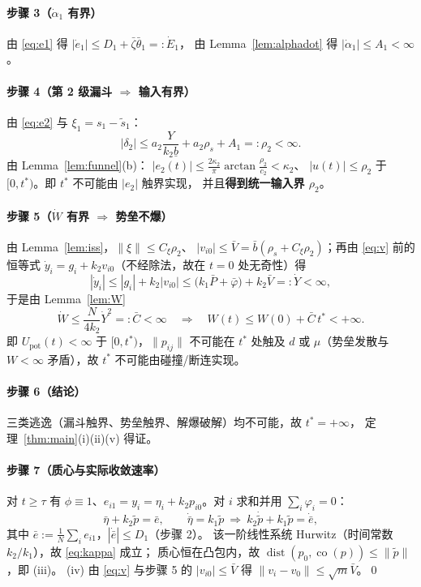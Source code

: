 \documentclass[11pt,a4paper]{article}
\newcommand{\ub}{\underline{b}}
\newcommand{\dist}{\operatorname{dist}}
\newcommand{\co}{\operatorname{co}}
\theoremstyle{plain}
\theoremstyle{definition}
\theoremstyle{remark}
\begin{document}
\paragraph{步骤 3（$\dot\alpha_1$ 有界）}
由 \eqref{eq:e1} 得 $|\dot e_1|\le D_1+\bar\zeta\bar\theta_1=:\dot E_1$，
由 Lemma~\ref{lem:alphadot} 得 $|\dot\alpha_1|\le A_1<\infty$。

\paragraph{步骤 4（第 2 级漏斗 $\Rightarrow$ 输入有界）}
由 \eqref{eq:e2} 与 $\xi_1=s_1-\tilde s_1$：
\begin{equation*}
|\delta_2|\le a_2\frac{Y}{k_2\ub}+a_2\rho_s+A_1=:\rho_2<\infty .
\end{equation*}
由 Lemma~\ref{lem:funnel}(b)：
$|e_2(t)|\le\frac{2\kappa_2}{\pi}\arctan\frac{\rho_2}{c_2}<\kappa_2$、
$|u(t)|\le\rho_2$ 于 $[0,t^\ast)$。即 $t^\ast$ 不可能由 $|e_2|$ 触界实现，
并且\textbf{得到统一输入界 $\rho_2$}。

\paragraph{步骤 5（$\dot W$ 有界 $\Rightarrow$ 势垒不爆）}
由 Lemma~\ref{lem:iss}，$\|\xi\|\le C_\xi\rho_2$、
$|v_{i0}|\le\bar V=\bar b(\rho_s+C_\xi\rho_2)$；再由 \eqref{eq:v} 前的恒等式
$\dot y_i=g_i+k_2v_{i0}$（不经除法，故在 $t=0$ 处无奇性）得
\begin{equation*}
|\dot y_i|\le|g_i|+k_2|v_{i0}|
\le\bigl(k_1\bar P+\bar\varphi\bigr)+k_2\bar V=:\dot Y<\infty,
\end{equation*}
于是由 Lemma~\ref{lem:W}
\begin{equation*}
\dot W\le\frac{N}{4k_2}\dot Y^2=:\bar C<\infty
\quad\Longrightarrow\quad
W(t)\le W(0)+\bar C\,t^\ast<+\infty .
\end{equation*}
即 $U_{\mathrm{pot}}(t)<\infty$ 于 $[0,t^\ast)$，$\|p_{ij}\|$ 不可能在 $t^\ast$
处触及 $d$ 或 $\mu$（势垒发散与 $W<\infty$ 矛盾），故 $t^\ast$ 不可能由碰撞/断连实现。

\paragraph{步骤 6（结论）}
三类逃逸（漏斗触界、势垒触界、解爆破解）均不可能，故 $t^\ast=+\infty$，
定理~\ref{thm:main}(i)(ii)(v) 得证。

\paragraph{步骤 7（质心与实际收敛速率）}
对 $t\ge\tau$ 有 $\phi\equiv1$、$e_{i1}=y_i=\eta_i+k_2p_{i0}$。对 $i$ 求和并用
$\sum_i\varphi_i=0$：
\begin{equation*}
\bar\eta+k_2\tilde p=\bar e,\qquad \dot{\bar\eta}=k_1\tilde p
\ \Longrightarrow\ k_2\dot{\tilde p}+k_1\tilde p=\dot{\bar e},
\end{equation*}
其中 $\bar e:=\frac1N\sum_ie_{i1}$，$|\dot{\bar e}|\le D_1$（步骤 2）。
该一阶线性系统 Hurwitz（时间常数 $k_2/k_1$），故 \eqref{eq:kappa} 成立；
质心恒在凸包内，故 $\dist(p_0,\co(p))\le\|\tilde p\|$，即 (iii)。
(iv) 由 \eqref{eq:v} 与步骤 5 的 $|v_{i0}|\le\bar V$ 得
$\|v_i-v_0\|\le\sqrt m\bar V$。\qed
\end{document}
